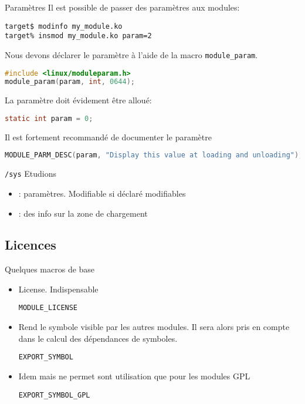 \begin{frame}[fragile=singleslide]{Paramètres}
  Il est possible de passer des paramètres aux modules:
  \begin{lstlisting}
target$ modinfo my_module.ko
target% insmod my_module.ko param=2
  \end{lstlisting} %
  Nous devons déclarer le paramètre à l'aide de la macro \texttt{module\_param}.
  \begin{lstlisting}[language=c]
#include <linux/moduleparam.h>
module_param(param, int, 0644);
  \end{lstlisting}
  La paramètre doit évidement être alloué:
  \begin{lstlisting}[language=c]
static int param = 0;
  \end{lstlisting}
  Il est fortement recommandé de documenter le paramètre
  \begin{lstlisting}[language=c]
MODULE_PARM_DESC(param, "Display this value at loading and unloading");
  \end{lstlisting}
\end{frame}

\begin{frame}[fragile=singleslide]{\texttt{/sys}}
  Etudions 
  \begin{itemize}
  \item                       {}:
    paramètres. Modifiable si déclaré modifiables
  \item {}:  des info sur  la zone
    de chargement
  \end{itemize}
\end{frame}

\subsection{Licences}

\begin{frame}[fragile=singleslide]{Quelques macros de base}
  \begin{itemize}
  \item License. Indispensable
    \begin{lstlisting}
MODULE_LICENSE
    \end{lstlisting}
  \item Rend le symbole visible par les autres modules.  Il sera alors
    pris en compte dans le calcul des dépendances de symboles.
    \begin{lstlisting}
EXPORT_SYMBOL
    \end{lstlisting}
  \item Idem  mais  ne permet sont utilisation que
    pour les modules GPL
    \begin{lstlisting}
EXPORT_SYMBOL_GPL
    \end{lstlisting}
  \end{itemize}
\end{frame}

